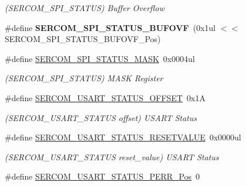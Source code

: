 \begin{DoxyCompactItemize}
\begin{DoxyCompactList}\small\item\em (S\+E\+R\+C\+O\+M\+\_\+\+S\+P\+I\+\_\+\+S\+T\+A\+T\+U\+S) Buffer Overflow \end{DoxyCompactList}\item 
\hypertarget{group___s_a_m_l21___s_e_r_c_o_m_gab8553642a6b5d5d87cf3f5a9afd61098}{}\#define {\bfseries S\+E\+R\+C\+O\+M\+\_\+\+S\+P\+I\+\_\+\+S\+T\+A\+T\+U\+S\+\_\+\+B\+U\+F\+O\+V\+F}~(0x1ul $<$$<$ S\+E\+R\+C\+O\+M\+\_\+\+S\+P\+I\+\_\+\+S\+T\+A\+T\+U\+S\+\_\+\+B\+U\+F\+O\+V\+F\+\_\+\+Pos)\label{group___s_a_m_l21___s_e_r_c_o_m_gab8553642a6b5d5d87cf3f5a9afd61098}

\item 
\hypertarget{group___s_a_m_l21___s_e_r_c_o_m_ga477f5ce5dfeff94c6dc44713f93d67a9}{}\#define \hyperlink{group___s_a_m_l21___s_e_r_c_o_m_ga477f5ce5dfeff94c6dc44713f93d67a9}{S\+E\+R\+C\+O\+M\+\_\+\+S\+P\+I\+\_\+\+S\+T\+A\+T\+U\+S\+\_\+\+M\+A\+S\+K}~0x0004ul\label{group___s_a_m_l21___s_e_r_c_o_m_ga477f5ce5dfeff94c6dc44713f93d67a9}

\begin{DoxyCompactList}\small\item\em (S\+E\+R\+C\+O\+M\+\_\+\+S\+P\+I\+\_\+\+S\+T\+A\+T\+U\+S) M\+A\+S\+K Register \end{DoxyCompactList}\item 
\hypertarget{group___s_a_m_l21___s_e_r_c_o_m_ga0338ddad210b69cc30af389ad5e257bc}{}\#define \hyperlink{group___s_a_m_l21___s_e_r_c_o_m_ga0338ddad210b69cc30af389ad5e257bc}{S\+E\+R\+C\+O\+M\+\_\+\+U\+S\+A\+R\+T\+\_\+\+S\+T\+A\+T\+U\+S\+\_\+\+O\+F\+F\+S\+E\+T}~0x1\+A\label{group___s_a_m_l21___s_e_r_c_o_m_ga0338ddad210b69cc30af389ad5e257bc}

\begin{DoxyCompactList}\small\item\em (S\+E\+R\+C\+O\+M\+\_\+\+U\+S\+A\+R\+T\+\_\+\+S\+T\+A\+T\+U\+S offset) U\+S\+A\+R\+T Status \end{DoxyCompactList}\item 
\hypertarget{group___s_a_m_l21___s_e_r_c_o_m_gaad625f3f9dc70ab1dbab4c7203dba6b1}{}\#define \hyperlink{group___s_a_m_l21___s_e_r_c_o_m_gaad625f3f9dc70ab1dbab4c7203dba6b1}{S\+E\+R\+C\+O\+M\+\_\+\+U\+S\+A\+R\+T\+\_\+\+S\+T\+A\+T\+U\+S\+\_\+\+R\+E\+S\+E\+T\+V\+A\+L\+U\+E}~0x0000ul\label{group___s_a_m_l21___s_e_r_c_o_m_gaad625f3f9dc70ab1dbab4c7203dba6b1}

\begin{DoxyCompactList}\small\item\em (S\+E\+R\+C\+O\+M\+\_\+\+U\+S\+A\+R\+T\+\_\+\+S\+T\+A\+T\+U\+S reset\+\_\+value) U\+S\+A\+R\+T Status \end{DoxyCompactList}\item 
\hypertarget{group___s_a_m_l21___s_e_r_c_o_m_ga431589ea5c36362b12ee56db595c6a76}{}\#define \hyperlink{group___s_a_m_l21___s_e_r_c_o_m_ga431589ea5c36362b12ee56db595c6a76}{S\+E\+R\+C\+O\+M\+\_\+\+U\+S\+A\+R\+T\+\_\+\+S\+T\+A\+T\+U\+S\+\_\+\+P\+E\+R\+R\+\_\+\+Pos}~0\label{group___s_a_m_l21___s_e_r_c_o_m_ga431589ea5c36362b12ee56db595c6a76}


\end{DoxyCompactItemize}
